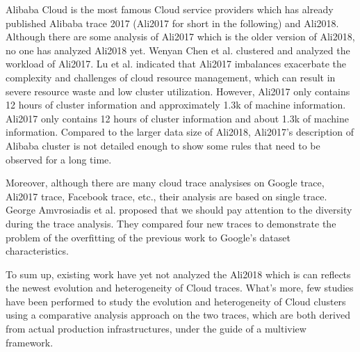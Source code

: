 \documentclass[conference]{IEEEtran}
\begin{document}
Alibaba Cloud is the most famous Cloud service providers which has already published Alibaba trace 2017 (Ali2017 for short in the following) and Ali2018. Although there are some analysis of Ali2017 which is the older version of Ali2018, no one has analyzed Ali2018 yet.
Wenyan Chen et al.\cite{chen2018Alibabaworkload} clustered and analyzed the workload of Ali2017. Lu et al.\cite{Lu2017AlibabaImbalance} indicated that Ali2017 imbalances exacerbate the complexity and challenges of cloud resource management, which can result in severe resource waste and low cluster utilization. However, Ali2017 only contains 12 hours of cluster information and approximately 1.3k of machine information. Ali2017 only contains 12 hours of cluster information and about 1.3k of machine information. Compared to the larger data size of Ali2018, Ali2017's description of Alibaba cluster is not detailed enough to show some rules that need to be observed for a long time.

Moreover, although there are many cloud trace analysises on Google trace, Ali2017 trace, Facebook trace, etc., their analysis are based on single trace.  George Amvrosiadis et al.\cite{George2018Diversity} proposed that we should pay attention to the diversity during the trace analysis. They compared four new traces to demonstrate the problem of the overfitting of the previous work to Google's dataset characteristics. 

To sum up, existing work have  yet not analyzed the Ali2018   which is  can reflects the newest evolution and heterogeneity of Cloud traces. What's more, few studies have been performed to study the evolution and heterogeneity of Cloud clusters using a comparative analysis approach on the two traces, which are both derived from actual production infrastructures, under the guide of a multiview framework.
\end{document}
